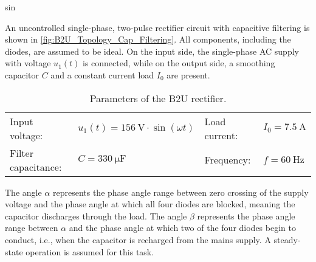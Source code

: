 sin%

An uncontrolled single-phase, two-pulse rectifier circuit with capacitive filtering 
is shown in \autoref{fig:B2U_Topology_Cap_Filtering}.
All components, including the diodes, are assumed to be ideal. On the input side, 
the single-phase AC supply with voltage $u_\mathrm{1}(t)$ is connected, while on the output side, 
a smoothing capacitor $C$ and a constant current load $I_\mathrm{0}$ are present.



\begin{table}[ht]
    \centering  %
    \begin{tabular}{llll}
        \toprule
        
        Input voltage: &  $u_\mathrm{1}(t) = \SI{156}{\volt}\cdot \sin(\omega t)$ & Load current: & $I_{\mathrm{0}} = \SI{7.5}{\ampere}$ \\ 
        Filter capacitance: & $C = \SI{330}{\micro\farad}$  & Frequency: & $f= \SI{60}{\hertz}$ \\ 
        \bottomrule
    \end{tabular}
    \caption{Parameters of the B2U rectifier.}  
    \label{table:ex05_Parameters of the circuit}
\end{table}

The angle $\alpha$ represents the phase angle range between zero crossing of the supply voltage and the phase angle
at which all four diodes are blocked, meaning the capacitor discharges through the load. The angle $\beta$ 
represents the phase angle range between $\alpha$ and the phase angle at which two of the four diodes begin to 
conduct, i.e., when the capacitor is recharged from the mains supply.
A steady-state operation is assumed for this task.

